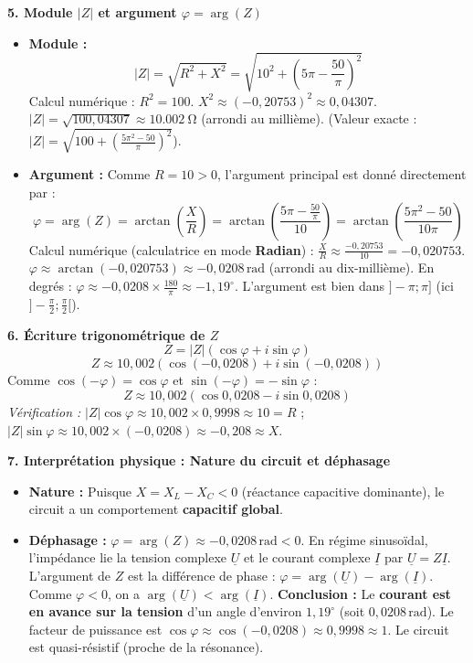 \documentclass[11pt]{article}
\begin{document}
\begin{exoresolu}
\textbf{5. Module $|Z|$ et argument $\varphi = \arg(Z)$}
\begin{itemize}
    \item \textbf{Module :}
    \[ |Z| = \sqrt{R^2 + X^2} = \sqrt{10^2 + \left(5\pi - \frac{50}{\pi}\right)^2} \]
    Calcul numérique :
    $R^2 = 100$.
    $X^2 \approx (-0,20753)^2 \approx 0,04307$.
    $|Z| = \sqrt{100,04307} \approx \SI{10,002}{\ohm}$ (arrondi au millième).
    (Valeur exacte : $|Z| = \sqrt{100 + \left(\frac{5\pi^2 - 50}{\pi}\right)^2}$).
    \item \textbf{Argument :}
    Comme $R = 10 > 0$, l'argument principal est donné directement par :
    \[ \varphi = \arg(Z) = \arctan\left(\frac{X}{R}\right) = \arctan\left(\frac{5\pi - \frac{50}{\pi}}{10}\right) = \arctan\left(\frac{5\pi^2 - 50}{10\pi}\right) \]
    Calcul numérique (calculatrice en mode \textbf{Radian}) :
    $\frac{X}{R} \approx \frac{-0,20753}{10} = -0,020753$.
    $\varphi \approx \arctan(-0,020753) \approx -0,0208\,\text{rad}$ (arrondi au dix-millième).
    En degrés : $\varphi \approx -0,0208 \times \frac{180}{\pi} \approx -1,19^\circ$.
    L'argument est bien dans $]-\pi; \pi]$ (ici $]-\frac{\pi}{2}; \frac{\pi}{2}[$).
\end{itemize}

\textbf{6. Écriture trigonométrique de $Z$}
\[ Z = |Z|(\cos\varphi + i\sin\varphi) \]
\[ Z \approx 10,002 \left( \cos(-0,0208) + i\sin(-0,0208) \right) \]
Comme $\cos(-\varphi) = \cos\varphi$ et $\sin(-\varphi) = -\sin\varphi$ :
\[ Z \approx 10,002 \left( \cos 0,0208 - i\sin 0,0208 \right) \]
\textit{Vérification :} $|Z|\cos\varphi \approx 10,002 \times 0,9998 \approx 10 = R$ ; $|Z|\sin\varphi \approx 10,002 \times (-0,0208) \approx -0,208 \approx X$.

\textbf{7. Interprétation physique : Nature du circuit et déphasage}
\begin{itemize}
    \item \textbf{Nature :} Puisque $X = X_L - X_C < 0$ (réactance capacitive dominante), le circuit a un comportement \textbf{capacitif global}.
    \item \textbf{Déphasage :} $\varphi = \arg(Z) \approx -0,0208\,\text{rad} < 0$.
    En régime sinusoïdal, l'impédance lie la tension complexe $\underline{U}$ et le courant complexe $\underline{I}$ par $\underline{U} = Z \underline{I}$.
    L'argument de $Z$ est la différence de phase : $\varphi = \arg(\underline{U}) - \arg(\underline{I})$.
    Comme $\varphi < 0$, on a $\arg(\underline{U}) < \arg(\underline{I})$.
    \textbf{Conclusion :} Le \textbf{courant est en avance sur la tension} d'un angle d'environ $1,19^\circ$ (soit $0,0208\,\text{rad}$).
    Le facteur de puissance est $\cos\varphi \approx \cos(-0,0208) \approx 0,9998 \approx 1$. Le circuit est quasi-résistif (proche de la résonance).
\end{itemize}


\end{exoresolu}
\end{document}
